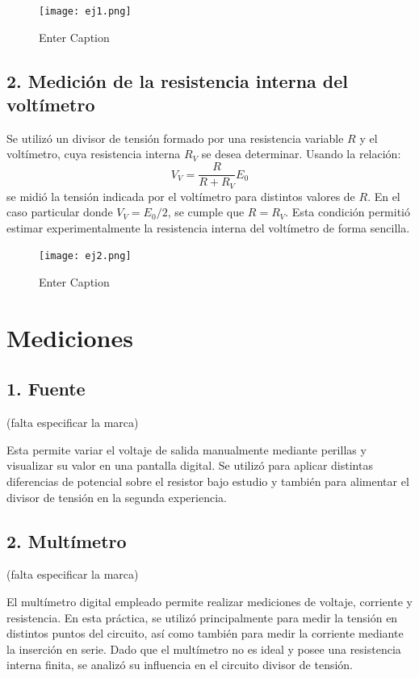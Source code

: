 \documentclass[11pt]{article}
\begin{document}
\begin{figure}[H]
    \centering
    \texttt{[image: ej1.png]}
    \caption{Enter Caption}
    \label{fig:enter-label}
\end{figure}

\subsection*{2. Medición de la resistencia interna del voltímetro}

Se utilizó un divisor de tensión formado por una resistencia variable \( R \) y el voltímetro, cuya resistencia interna \( R_V \) se desea determinar. Usando la relación:
\[
V_V = \frac{R}{R + R_V} E_0
\]
se midió la tensión indicada por el voltímetro para distintos valores de \( R \). En el caso particular donde \( V_V = E_0 / 2 \), se cumple que \( R = R_V \). Esta condición permitió estimar experimentalmente la resistencia interna del voltímetro de forma sencilla.

\begin{figure}[H]
    \centering
    \texttt{[image: ej2.png]}
    \caption{Enter Caption}
    \label{fig:enter-label}
\end{figure}

\section*{Mediciones}

\subsection*{1. Fuente}

(falta especificar la marca)%

Esta permite variar el voltaje de salida manualmente mediante perillas y visualizar su valor en una pantalla digital. Se utilizó para aplicar distintas diferencias de potencial sobre el resistor bajo estudio y también para alimentar el divisor de tensión en la segunda experiencia.

\subsection*{2. Multímetro}

(falta especificar la marca)%

El multímetro digital empleado permite realizar mediciones de voltaje, corriente y resistencia. En esta práctica, se utilizó principalmente para medir la tensión en distintos puntos del circuito, así como también para medir la corriente mediante la inserción en serie. Dado que el multímetro no es ideal y posee una resistencia interna finita, se analizó su influencia en el circuito divisor de tensión.
\end{document}
